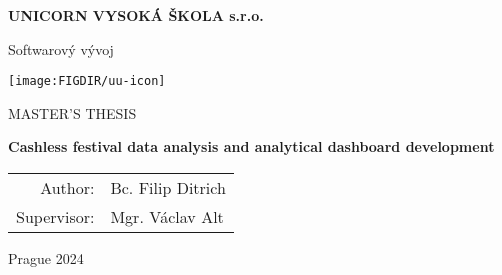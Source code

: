 \pagestyle{empty}
\begin{center}

{\bfseries\large UNICORN VYSOKÁ ŠKOLA s.r.o.}

    \vspace{5mm}

    {\Large Softwarový vývoj}

    \vfill
    \vspace{5mm}

    \centerline{\mbox{\texttt{[image: \\FIGDIR/uu-icon]}}}

    \vfill
    \vspace{5mm}

    {\large\MakeUppercase{Master's Thesis}}

    \vspace{15mm}

    {\LARGE\bfseries Cashless festival data analysis and analytical dashboard development}

    \vfill

    \begin{tabular}{rl}
        Author: & Bc. Filip Ditrich \\
        \noalign{\vspace{2mm}}
        Supervisor: & Mgr. Václav Alt \\
    \end{tabular}

    \vfill

    Prague 2024

\end{center}
